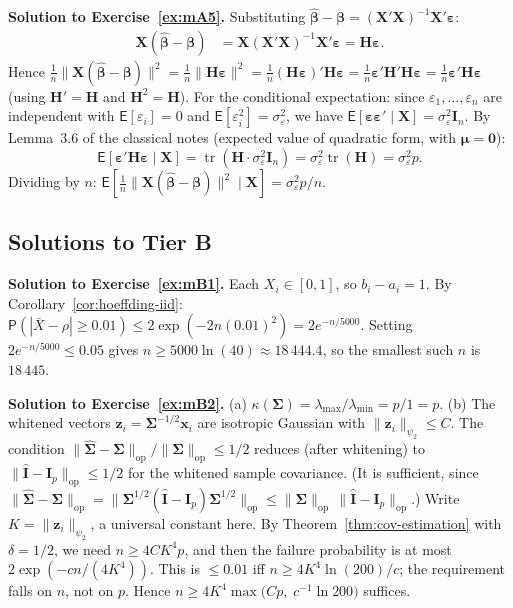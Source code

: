 \documentclass[12pt,a4paper]{article}
\theoremstyle{definition}
\newcommand\expc{\mathsf{E}}
\newcommand\prb{\mathsf{P}}
\DeclareMathOperator\tr{tr}
\newcommand{\bX}{\mathbf{X}}
\newcommand{\bx}{\mathbf{x}}
\def\bb{\boldsymbol{\beta}}
\newcommand{\be}{\boldsymbol{\varepsilon}}
\newcommand{\bI}{\mathbf{I}}
\newcommand{\bH}{\mathbf{H}}
\newcommand{\bzero}{\mathbf{0}}
\newcommand{\bz}{\mathbf{z}}
\newcommand{\bSigma}{\boldsymbol{\Sigma}}
\newcommand{\hbSigma}{\hat{\boldsymbol{\Sigma}}}
\newcommand{\hbb}{\hat{\boldsymbol{\beta}}}
\newcommand{\opnorm}[1]{\|#1\|_{\mathrm{op}}}
\begin{document}
\textbf{Solution to Exercise~\ref{ex:mA5}.} Substituting $\hbb - \bb = (\bX'\bX)^{-1}\bX'\be$:
\begin{align*}
\bX(\hbb - \bb) &= \bX(\bX'\bX)^{-1}\bX'\be = \bH\be.
\end{align*}
Hence $\frac{1}{n}\|\bX(\hbb-\bb)\|^2 = \frac{1}{n}\|\bH\be\|^2 = \frac{1}{n}(\bH\be)'\bH\be = \frac{1}{n}\be'\bH'\bH\be = \frac{1}{n}\be'\bH\be$ (using $\bH' = \bH$ and $\bH^2 = \bH$). For the conditional expectation: since $\varepsilon_1, \ldots, \varepsilon_n$ are independent with $\expc[\varepsilon_i] = 0$ and $\expc[\varepsilon_i^2] = \sigma_\varepsilon^2$, we have $\expc[\be\be' \mid \bX] = \sigma_\varepsilon^2\bI_n$. By Lemma~3.6 of the classical notes (expected value of quadratic form, with $\boldsymbol\mu = \bzero$):
\[
\expc[\be'\bH\be \mid \bX] = \tr(\bH\cdot\sigma_\varepsilon^2\bI_n) = \sigma_\varepsilon^2\tr(\bH) = \sigma_\varepsilon^2 p.
\]
Dividing by $n$: $\expc[\frac{1}{n}\|\bX(\hbb-\bb)\|^2 \mid \bX] = \sigma_\varepsilon^2 p/n$.

\subsection*{Solutions to Tier B}

\textbf{Solution to Exercise~\ref{ex:mB1}.} Each $X_i \in [0, 1]$, so $b_i - a_i = 1$. By Corollary~\ref{cor:hoeffding-iid}: $\prb(|\bar{X} - \rho| \geqslant 0.01) \leqslant 2\exp(-2n(0.01)^2) = 2e^{-n/5000}$. Setting $2e^{-n/5000} \leqslant 0.05$ gives $n \geqslant 5000\ln(40) \approx 18\,444.4$, so the smallest such $n$ is $18\,445$.

\textbf{Solution to Exercise~\ref{ex:mB2}.} (a) $\kappa(\bSigma) = \lambda_{\max}/\lambda_{\min} = p/1 = p$. (b) The whitened vectors $\bz_i = \bSigma^{-1/2}\bx_i$ are isotropic Gaussian with $\|\bz_i\|_{\psi_2} \leqslant C$. The condition $\opnorm{\hbSigma - \bSigma}/\opnorm{\bSigma} \leqslant 1/2$ reduces (after whitening) to $\opnorm{\hat{\mathbf{I}} - \bI_p} \leqslant 1/2$ for the whitened sample covariance. (It is sufficient, since $\opnorm{\hbSigma - \bSigma} = \opnorm{\bSigma^{1/2}(\hat{\mathbf{I}} - \bI_p)\bSigma^{1/2}} \leqslant \opnorm{\bSigma}\,\opnorm{\hat{\mathbf{I}} - \bI_p}$.) Write $K = \|\bz_i\|_{\psi_2}$, a universal constant here. By Theorem~\ref{thm:cov-estimation} with $\delta = 1/2$, we need $n \geqslant 4CK^4p$, and then the failure probability is at most $2\exp(-cn/(4K^4))$. This is $\leqslant 0.01$ iff $n \geqslant 4K^4\ln(200)/c$; the requirement falls on $n$, not on $p$. Hence $n \geqslant 4K^4\max\!\big(Cp,\; c^{-1}\ln 200\big)$ suffices.
\end{document}
